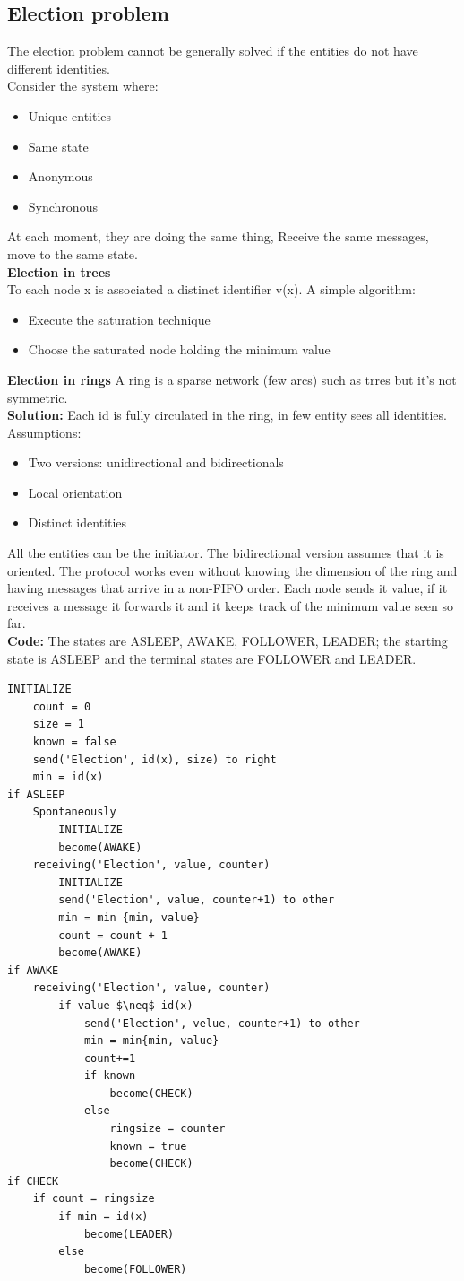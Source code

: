 \documentclass[paper=a4, fontsize=11pt]{scrartcl} %
\numberwithin{equation}{section} %
\numberwithin{figure}{section} %
\numberwithin{table}{section} %
\begin{document}
\subsection*{Election problem}
The election problem cannot be generally solved if the entities do not have different identities.\\
Consider the system where:
\begin{itemize}
\item Unique entities
\item Same state
\item Anonymous
\item Synchronous
\end{itemize}
At each moment, they are doing the same thing, Receive the same messages, move to the same state.\\
\textbf{Election in trees}\\
To each node x is associated a distinct identifier v(x). A simple algorithm:
\begin{itemize}
\item Execute the saturation technique
\item Choose the saturated node holding the minimum value
\end{itemize}
\textbf{Election in rings}
A ring is a sparse network (few arcs) such as trres but it's not symmetric. \\
\textbf{Solution:} Each id is fully circulated in the ring, in few entity sees all identities.
Assumptions:
\begin{itemize}
\item Two versions: unidirectional and bidirectionals
\item Local orientation
\item Distinct identities
\end{itemize}
All the entities can be the initiator. The bidirectional version assumes that it is oriented. The protocol works even without knowing the dimension of the ring and having messages that arrive in a non-FIFO order. Each node sends it value, if it receives a message it forwards it and it keeps track of the minimum value seen so far.\\
\textbf{Code:} The states are ASLEEP, AWAKE, FOLLOWER, LEADER; the starting state is ASLEEP and the terminal states are FOLLOWER and LEADER. 
\begin{lstlisting}
INITIALIZE
	count = 0
	size = 1
	known = false
	send('Election', id(x), size) to right
	min = id(x)
if ASLEEP
	Spontaneously
		INITIALIZE
		become(AWAKE)
	receiving('Election', value, counter)
		INITIALIZE
		send('Election', value, counter+1) to other
		min = min {min, value}
		count = count + 1
		become(AWAKE)
if AWAKE
	receiving('Election', value, counter)
		if value $\neq$ id(x)
			send('Election', velue, counter+1) to other
			min = min{min, value}
			count+=1
			if known 
				become(CHECK)
			else
				ringsize = counter
				known = true
				become(CHECK)
if CHECK
	if count = ringsize
		if min = id(x)
			become(LEADER)
		else
			become(FOLLOWER)										
\end{lstlisting}
\end{document}
